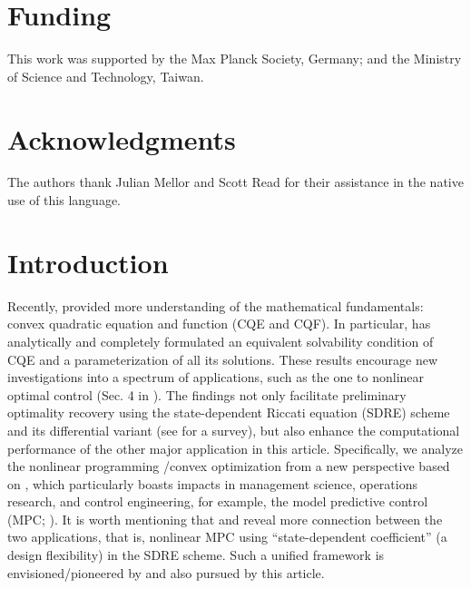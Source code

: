 \documentclass{imaman}
\numberwithin{equation}{section}
\begin{document}
\section*{Funding}
This work was supported by the Max Planck Society, Germany; and the Ministry of Science and Technology, Taiwan.

\section*{Acknowledgments}
The authors thank Julian Mellor and Scott Read for their assistance in the native use of this language.


\newpage
\setcounter{page}{1}

\section{Introduction}
\label{Sec_Intro}
Recently, \cite{LiLiHs:20} provided more understanding of the mathematical fundamentals: convex quadratic equation and function (CQE and CQF). In particular, \cite{LiLiHs:20} has analytically and completely formulated an equivalent solvability condition of CQE and a parameterization of all its solutions. These results encourage new investigations into a spectrum of applications, such as the one to nonlinear optimal control (Sec. 4 in \cite{LiLiHs:20}). The findings not only facilitate preliminary optimality recovery using the state-dependent Riccati equation (SDRE) scheme and its differential variant (see \cite{Cim:10} for a survey), but also enhance the computational performance of the other major application in this article. Specifically, we analyze the nonlinear programming \citep{Lu(Ye):03(16)}/convex optimization \citep{BoVa:04} from a new perspective based on \cite{LiLiHs:20}, which particularly boasts impacts in management science, operations research, and control engineering, for example, the model predictive control (MPC; \cite{CiFa:12}). It is worth mentioning that \cite{KaWaLiShPe:18} and \cite{QuSu:18} reveal more connection between the two applications, that is, nonlinear MPC using ``state-dependent coefficient'' (a design flexibility) in the SDRE scheme. Such a unified framework is envisioned/pioneered by \cite{BeMoDuPi:02} and also pursued by this article.
\end{document}
